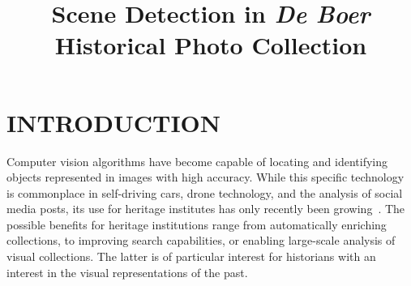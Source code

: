 \documentclass[a4paper,twoside]{article}
\begin{document}
\title{Scene Detection in \textit{De Boer} Historical Photo Collection}

\author{
}



\onecolumn \maketitle \normalsize \setcounter{footnote}{0} \vfill

\section{INTRODUCTION}
\label{sec:introduction}

\noindent Computer vision algorithms have become capable of locating and identifying objects represented in images with high accuracy.
While this specific technology is commonplace in self-driving cars, drone technology, and the analysis of social media posts, its use for heritage institutes has only recently been growing~\cite{bhargav_deep_2019,bell_computing_2018,mager_visual_2020,niebling_analyzing_2020}. 
The possible benefits for heritage institutions range from automatically enriching collections, to improving search capabilities, or enabling large-scale analysis of visual collections. 
The latter is of particular interest for historians with an interest in the visual representations of the past.
\end{document}
